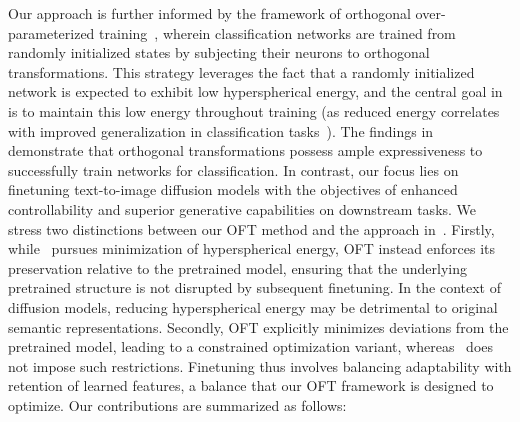 Our approach is further informed by the framework of orthogonal over-parameterized training~\cite{liu2021orthogonal}, wherein classification networks are trained from randomly initialized states by subjecting their neurons to orthogonal transformations. This strategy leverages the fact that a randomly initialized network is expected to exhibit low hyperspherical energy, and the central goal in~\cite{liu2021orthogonal} is to maintain this low energy throughout training (as reduced energy correlates with improved generalization in classification tasks~\cite{liu2018learning,lin2020regularizing}). The findings in~\cite{liu2021orthogonal} demonstrate that orthogonal transformations possess ample expressiveness to successfully train networks for classification. In contrast, our focus lies on finetuning text-to-image diffusion models with the objectives of enhanced controllability and superior generative capabilities on downstream tasks. We stress two distinctions between our OFT method and the approach in~\cite{liu2021orthogonal}. Firstly, while~\cite{liu2021orthogonal} pursues minimization of hyperspherical energy, OFT instead enforces its preservation relative to the pretrained model, ensuring that the underlying pretrained structure is not disrupted by subsequent finetuning. In the context of diffusion models, reducing hyperspherical energy may be detrimental to original semantic representations. Secondly, OFT explicitly minimizes deviations from the pretrained model, leading to a constrained optimization variant, whereas~\cite{liu2021orthogonal} does not impose such restrictions. Finetuning thus involves balancing adaptability with retention of learned features, a balance that our OFT framework is designed to optimize. Our contributions are summarized as follows:


